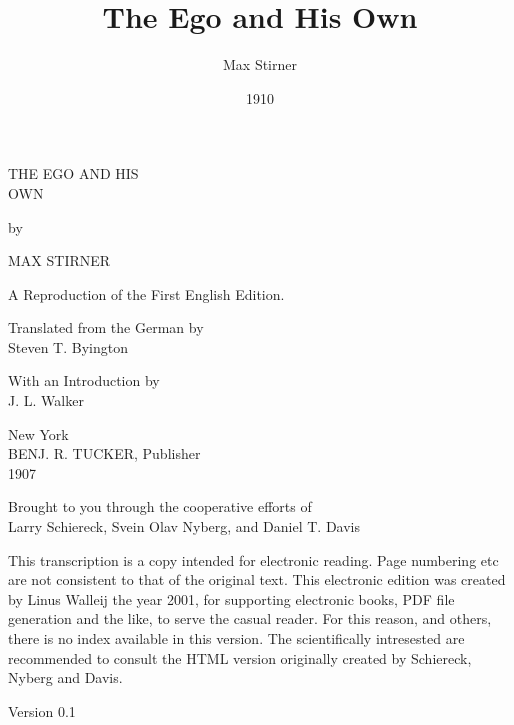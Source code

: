 \documentclass[12pt,a4paper]{book}
\title{The Ego and His Own}
\author{Max Stirner}
\date{1910}
\begin{document}
\maketitle

\tableofcontents

\newpage{}

\begin{center}
{\Huge THE EGO AND HIS\\
\medskip{}
OWN}

\medskip{}

by

\medskip{}

{\Huge MAX STIRNER}

\medskip{}

A Reproduction of the First English Edition.

\medskip{}

Translated from the German by\\
Steven T. Byington

\medskip{}

With an Introduction by\\
 J. L. Walker

\medskip{}

New York\\
BENJ. R. TUCKER, Publisher\\
1907

\medskip{}

Brought to you through the cooperative efforts of\\
Larry Schiereck, Svein Olav Nyberg, and Daniel T. Davis

\end{center}

\medskip{}

\noindent{}This transcription is a copy intended for 
electronic reading. Page numbering 
etc are not consistent to that of the original text. This electronic edition 
was created by Linus Walleij the year 2001, for supporting electronic books, 
PDF file generation and the like, to serve the casual reader. For this reason, 
and others, there is no index available in this version. The scientifically 
intresested are recommended to consult the HTML version originally created by 
Schiereck, Nyberg and Davis.

\medskip{}

\begin{center}
Version 0.1\end{center}

\medskip{}
\end{document}
